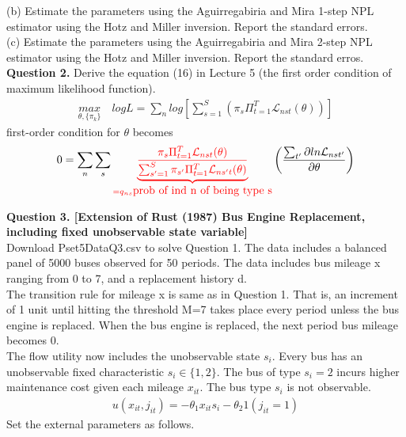 \documentclass[paper=a4, fontsize=13pt]{extarticle} %
\numberwithin{equation}{section} %
\numberwithin{figure}{section} %
\numberwithin{table}{section} %
\begin{document}
(b) Estimate the parameters using the Aguirregabiria and Mira 1-step NPL estimator using the Hotz and Miller inversion. Report the standard errors. \\

(c) Estimate the parameters using the Aguirregabiria and Mira 2-step NPL estimator using the Hotz and Miller inversion. Report the standard erros. \\


\vspace{0.2in}
\textbf{Question 2.} Derive the equation (16) in Lecture 5 (the first order condition of maximum likelihood function). 
\begin{gather*}
\underset{\theta, \{\pi_k\} }{max} \quad log L = \sum_n  log \left[ \sum_{s=1}^{S} \left( \pi_s \Pi_{t=1}^{T} \mathcal{L}_{nst} (\theta) \right) \right]
\end{gather*}
first-order condition for $\theta$ becomes
\begin{gather}
0=\sum_n \sum_s \color{red} \underbrace{ \frac{\pi_s \Pi_{t=1}^{T} \mathcal{L}_{nst} (\theta)}{ \sum_{s'=1}^{S} \pi_{s'} \Pi_{t=1}^{T} \mathcal{L}_{ns't} (\theta)  } }_{ = q_{ns} \mbox{prob of ind n of being type s} } \color{black} \left( \frac{\sum_{t'} \partial ln \mathcal{L}_{nst'} }{\partial \theta} \right) \label{eq.foc}
\end{gather}


\vspace{0.2in}
\textbf{Question 3. [Extension of Rust (1987) Bus Engine Replacement, including fixed unobservable state variable]} \\

Download Pset5DataQ3.csv to solve Question 1. The data includes a balanced panel of 5000 buses observed for 50 periods. The data includes bus mileage x ranging from 0 to 7, and a replacement history d. \\

The transition rule for mileage x is same as in Question 1. That is, an increment of 1 unit until hitting the threshold M=7 takes place every period unless the bus engine is replaced. When the bus engine is replaced, the next period bus mileage becomes 0. \\

The flow utility now includes the unobservable state $s_i$. Every bus has an unobservable fixed characteristic $s_i \in \{1, 2\}$. The bus of type $s_i =2$ incurs higher maintenance cost given each mileage $x_{it}$. The bus type $s_i$ is not observable.  
\begin{gather}
u(x_{it}, j_{it}) = -\theta_1 x_{it} s_i - \theta_2 1(j_{it}=1)
\end{gather}
Set the external parameters as follows. 
\end{document}
